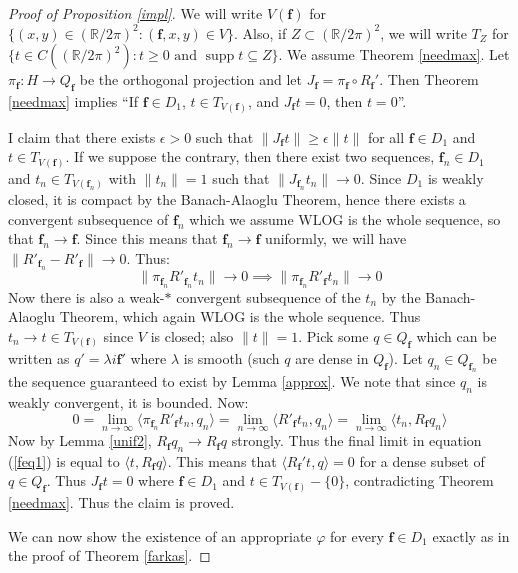 \documentclass{amsart}
\newcommand{\R}			{\mathbb R}
\newcommand{\f}			{\mathbf f}
\newcommand{\map}		{\longrightarrow}
\newcommand{\supp}		{\operatorname{supp}}
\numberwithin{equation}{section}
\begin{document}
\begin{proof}[Proof of Proposition \ref{impl}]
We will write $V(\f)$ for 
$\{(x,y)\in(\R/2\pi)^2:(\f,x,y)\in V\}$.  Also, if 
$Z\subset(\R/2\pi)^2$, we will write $T_Z$ for 
$\{t\in C((\R/2\pi)^2):t\geq 0\text{ and }\supp t\subseteq Z\}$.  
We assume Theorem \ref{needmax}.  Let 
$\pi_\f:H\map Q_\f$ be the orthogonal projection and let 
$J_\f=\pi_\f\circ R_\f'$.  Then Theorem \ref{needmax} implies 
``If $\f\in D_1$, $t\in T_{V(\f)}$, and $J_\f t=0$, then 
$t=0$''.

I claim that there exists $\epsilon>0$ such that 
$\|J_\f t\|\geq\epsilon\|t\|$ for 
all $\f\in D_1$ and $t\in T_{V(\f)}$.  If we suppose 
the contrary, then there exist two sequences, $\f_n\in D_1$ 
and $t_n\in T_{V(\f_n)}$ with $\|t_n\|=1$ 
such that $\|J_{\f_n}t_n\|\to 0$.  Since 
$D_1$ is weakly closed, it is compact by the 
Banach-Alaoglu Theorem, hence there exists a convergent 
subsequence of $\f_n$ which we assume WLOG is the 
whole sequence, so that $\f_n\to\f$.  Since 
this means that $\f_n\to\f$ uniformly, we will have 
$\|R'_{\f_n}-R'_\f\|\to 0$.  Thus:
\begin{equation}
\|\pi_{\f_n}R'_{\f_n}t_n\|\to 0\implies\|\pi_{\f_n}R'_\f t_n\|\to 0
\end{equation}
Now there is also a weak-$*$ convergent subsequence of the 
$t_n$ by the Banach-Alaoglu Theorem, which again WLOG 
is the whole sequence.  Thus $t_n\to t\in T_{V(\f)}$ 
since $V$ is closed; also $\|t\|=1$.  Pick some $q\in Q_\f$ 
which can be written as $q'=\lambda i\f'$ where $\lambda$ 
is smooth (such $q$ are dense in $Q_\f$).  Let $q_n\in Q_{\f_n}$ 
be the sequence guaranteed to exist by Lemma \ref{approx}.  We note 
that since $q_n$ is weakly convergent, it is bounded.  Now:
\begin{equation}\label{feq1}
0=\lim_{n\to\infty}\langle\pi_{\f_n}R'_\f t_n,q_n\rangle
=\lim_{n\to\infty}\langle R'_\f t_n,q_n\rangle
=\lim_{n\to\infty}\langle t_n,R_\f q_n\rangle
\end{equation}
Now by Lemma \ref{unif2}, $R_\f q_n\to R_\f q$ strongly.  
Thus the final limit in equation (\ref{feq1}) is equal to 
$\langle t,R_\f q\rangle$.  This means that $\langle R_\f't,q\rangle=0$ 
for a dense subset of $q\in Q_\f$.  Thus $J_\f t=0$ where 
$\f\in D_1$ and $t\in T_{V(\f)}-\{0\}$, contradicting 
Theorem \ref{needmax}.  Thus the claim is proved.

We can now show the existence of an appropriate $\varphi$ 
for every $\f\in D_1$ exactly as in the proof of Theorem 
\ref{farkas}.


\end{proof}
\end{document}
